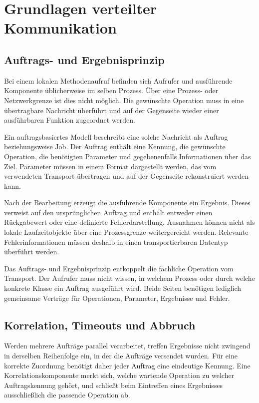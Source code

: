 \section{Grundlagen verteilter Kommunikation}

\subsection{Auftrags- und Ergebnisprinzip}

Bei einem lokalen Methodenaufruf befinden sich Aufrufer und ausführende Komponente üblicherweise im selben Prozess. Über eine Prozess- oder Netzwerkgrenze ist dies nicht möglich. Die gewünschte Operation muss in eine übertragbare Nachricht überführt und auf der Gegenseite wieder einer ausführbaren Funktion zugeordnet werden.

Ein auftragsbasiertes Modell beschreibt eine solche Nachricht als Auftrag beziehungsweise Job. Der Auftrag enthält eine Kennung, die gewünschte Operation, die benötigten Parameter und gegebenenfalls Informationen über das Ziel. Parameter müssen in einem Format dargestellt werden, das vom verwendeten Transport übertragen und auf der Gegenseite rekonstruiert werden kann.

Nach der Bearbeitung erzeugt die ausführende Komponente ein Ergebnis. Dieses verweist auf den ursprünglichen Auftrag und enthält entweder einen Rückgabewert oder eine definierte Fehlerdarstellung. Ausnahmen können nicht als lokale Laufzeitobjekte über eine Prozessgrenze weitergereicht werden. Relevante Fehlerinformationen müssen deshalb in einen transportierbaren Datentyp überführt werden.

Das Auftrags- und Ergebnisprinzip entkoppelt die fachliche Operation vom Transport. Der Aufrufer muss nicht wissen, in welchem Prozess oder durch welche konkrete Klasse ein Auftrag ausgeführt wird. Beide Seiten benötigen lediglich gemeinsame Verträge für Operationen, Parameter, Ergebnisse und Fehler.

\subsection{Korrelation, Timeouts und Abbruch}

Werden mehrere Aufträge parallel verarbeitet, treffen Ergebnisse nicht zwingend in derselben Reihenfolge ein, in der die Aufträge versendet wurden. Für eine korrekte Zuordnung benötigt daher jeder Auftrag eine eindeutige Kennung. Eine Korrelationskomponente merkt sich, welche wartende Operation zu welcher Auftragskennung gehört, und schließt beim Eintreffen eines Ergebnisses ausschließlich die passende Operation ab.

